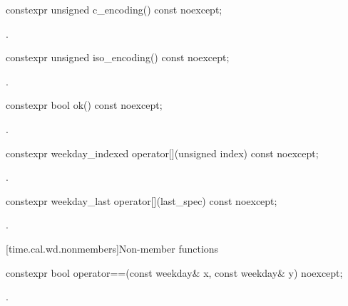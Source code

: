 %
\begin{itemdecl}
constexpr unsigned c_encoding() const noexcept;
\end{itemdecl}

\begin{itemdescr}
\pnum
\returns
{}.
\end{itemdescr}

%
\begin{itemdecl}
constexpr unsigned iso_encoding() const noexcept;
\end{itemdecl}

\begin{itemdescr}
\pnum
\returns
{}.
\end{itemdescr}

%
\begin{itemdecl}
constexpr bool ok() const noexcept;
\end{itemdecl}

\begin{itemdescr}
\pnum
\returns
{}.
\end{itemdescr}

%
\begin{itemdecl}
constexpr weekday_indexed operator[](unsigned index) const noexcept;
\end{itemdecl}

\begin{itemdescr}
\pnum
\returns
{}.
\end{itemdescr}

%
\begin{itemdecl}
constexpr weekday_last operator[](last_spec) const noexcept;
\end{itemdecl}

\begin{itemdescr}
\pnum
\returns
{}.
\end{itemdescr}

[time.cal.wd.nonmembers]{Non-member functions}

%
\begin{itemdecl}
constexpr bool operator==(const weekday& x, const weekday& y) noexcept;
\end{itemdecl}

\begin{itemdescr}
\pnum
\returns
{}.
\end{itemdescr}

